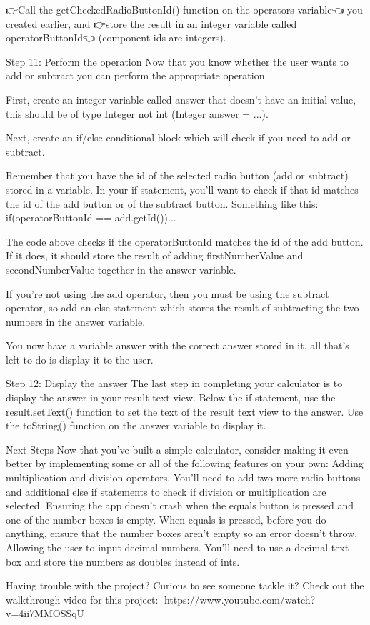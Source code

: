         👉Call the getCheckedRadioButtonId() function on the operators variable👈 you created earlier, and 👉store the result in an integer variable called operatorButtonId👈 (component ids are integers).

    Step 11: Perform the operation
        Now that you know whether the user wants to add or subtract you can perform the appropriate operation.

        First, create an integer variable called answer that doesn’t have an initial value, this should be of type Integer not int (Integer answer = ...).

        Next, create an if/else conditional block which will check if you need to add or subtract.

        Remember that you have the id of the selected radio button (add or subtract) stored in a variable. In your if statement, you’ll want to check if that id matches the id of the add button or of the subtract button. Something like this:
            if(operatorButtonId == add.getId()){...}
    
        The code above checks if the operatorButtonId matches the id of the add button. If it does, it should store the result of adding firstNumberValue and secondNumberValue together in the answer variable.

        If you’re not using the add operator, then you must be using the subtract operator, so add an else statement which stores the result of subtracting the two numbers in the answer variable.

        You now have a variable answer with the correct answer stored in it, all that’s left to do is display it to the user.

    Step 12: Display the answer
        The last step in completing your calculator is to display the answer in your result text view. Below the if statement, use the result.setText() function to set the text of the result text view to the answer. Use the toString() function on the answer variable to display it.

Next Steps
    Now that you’ve built a simple calculator, consider making it even better by implementing some or all of the following features on your own:
        Adding multiplication and division operators.
                You’ll need to add two more radio buttons and additional else if statements to check if division or multiplication are selected.
        Ensuring the app doesn’t crash when the equals button is pressed and one of the number boxes is empty.
            When equals is pressed, before you do anything, ensure that the number boxes aren’t empty so an error doesn’t throw.
        Allowing the user to input decimal numbers.
            You’ll need to use a decimal text box and store the numbers as doubles instead of ints.

    Having trouble with the project? Curious to see someone tackle it? Check out the walkthrough video for this project:
        🔗https://www.youtube.com/watch?v=4ii7MMOSSqU

